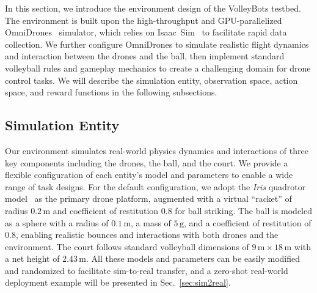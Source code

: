 
In this section, we introduce the environment design of the VolleyBots testbed. The environment is built upon the high-throughput and GPU-parallelized OmniDrones~\cite{xu2024omnidrones} simulator, which relies on Isaac~Sim~\cite{Mittal_2023} to facilitate rapid data collection. We further configure OmniDrones to simulate realistic flight dynamics and interaction between the drones and the ball, then implement standard volleyball rules and gameplay mechanics to create a challenging domain for drone control tasks. We will describe the simulation entity, observation space, action space, and reward functions in the following subsections.

\subsection{Simulation Entity}

Our environment simulates real-world physics dynamics and interactions of three key components including the drones, the ball, and the court.
We provide a flexible configuration of each entity's model and parameters to enable a wide range of task designs. For the default configuration, we adopt the \textit{Iris} quadrotor model~\cite{furrer2016rotors} as the primary drone platform, augmented with a virtual ``racket'' of radius $0.2\,\text{m}$ and coefficient of restitution $0.8$ for ball striking. The ball is modeled as a sphere with a radius of $0.1\,\text{m}$, a mass of $5\,\text{g}$, and a coefficient of restitution of $0.8$, enabling realistic bounces and interactions with both drones and the environment. The court follows standard volleyball dimensions of $9\,\text{m} \times 18\,\text{m}$ with a net height of $2.43\,\text{m}$. All these models and parameters can be easily modified and randomized to facilitate sim-to-real transfer, and a zero-shot real-world deployment example will be presented in Sec.~\ref{sec:sim2real}.

